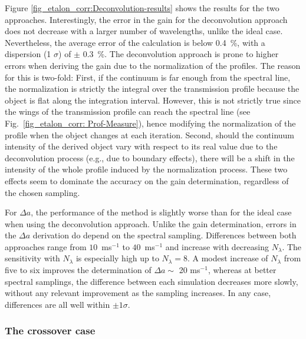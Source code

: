 Figure \ref{fig_etalon_corr:Deconvolution-results} shows the results for the two approaches. Interestingly, the error in the gain for the deconvolution approach does not decrease with a larger number of wavelengths, unlike the ideal case. Nevertheless, the average error of the calculation is below 0.4~\%, with a dispersion (1 $\sigma$) of $\pm$ 0.3~\%. The deconvolution approach is prone to higher errors when deriving the gain due to the normalization of the profiles. The reason for this is two-fold: First, if the continuum is far enough from the spectral line, the normalization is strictly the integral over the transmission profile because the object is flat along the integration interval. However, this is not strictly true since the wings of the transmission profile can reach the spectral line (see Fig.~\ref{fig_etalon_corr: Prof-Measure}), hence modifying the normalization of the profile when the object changes at each iteration. Second, should the continuum intensity of the derived object vary with respect to its real value due to the deconvolution process (e.g., due to boundary effects), there will be a shift in the intensity of the whole profile induced by the normalization process. These two effects seem to dominate the accuracy on the gain determination, regardless of the chosen sampling.

For $\Delta a$, the performance of the method is slightly worse than for the ideal case when using the deconvolution approach. Unlike the gain determination, errors in the $\Delta a$ derivation do depend on the spectral sampling. Differences between both approaches range from $10$~ms$^{-1}$ to $40$~ms$^{-1}$ and increase with decreasing $N_\lambda$. The sensitivity with $N_\lambda$ is especially high up to $N_\lambda = 8$. A modest increase of $N_\lambda$ from five to six improves the determination of $\Delta a \sim$ 20 ms$^{-1}$, whereas at better spectral samplings, the difference between each simulation decreases more slowly, without any relevant improvement as the sampling increases. In any case, differences are all well within $\pm 1\sigma$.

\subsubsection{The crossover case}

